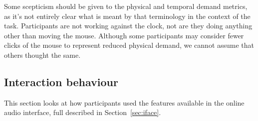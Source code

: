 Some scepticism should be given to the physical and temporal demand metrics, as it's not entirely clear what is meant
by that terminology in the context of the task. Participants are not working against the clock, not are they doing
anything other than moving the mouse. Although some participants may consider fewer clicks of the mouse to represent
reduced physical demand, we cannot assume that others thought the same.

\subsection{Interaction behaviour}
This section looks at how participants used the features available in the online audio interface, full described in
Section~\ref{sec:iface}.





